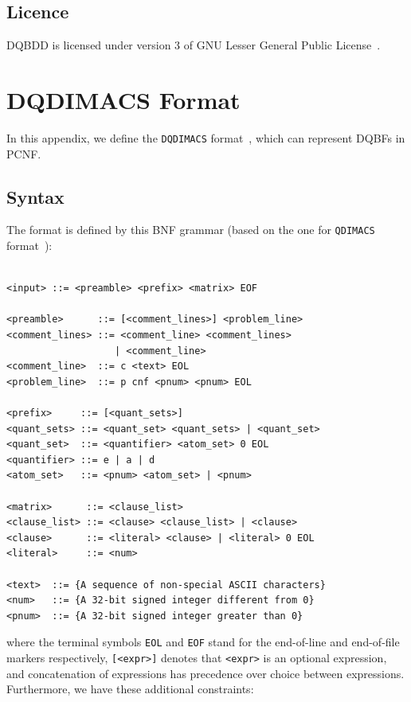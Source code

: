 \documentclass[
  digital, %
  color,
  twoside, %
  table,   %
  nolof,     %
  nolot,     %
]{fithesis3}
\theoremstyle{definition}
\theoremstyle{remark}
\newcommand{\DQDIMACS}[0]{\texttt{DQDIMACS}}
\begin{document}
\section{Licence}
DQBDD is licensed under version 3 of GNU Lesser General Public License~\cite{lgplv3}.

\chapter{DQDIMACS Format}
\label{appendix:DQDIMACS}
In this appendix, we define the \DQDIMACS{} format~\cite{iDQandDQDIMACS}, which can represent DQBFs in PCNF. 

\section{Syntax}
The format is defined by this BNF grammar (based on the one for \texttt{QDIMACS} format~\cite{QDIMACS}):
\begin{verbatim}

<input> ::= <preamble> <prefix> <matrix> EOF

<preamble>      ::= [<comment_lines>] <problem_line>
<comment_lines> ::= <comment_line> <comment_lines> 
                   | <comment_line> 
<comment_line>  ::= c <text> EOL
<problem_line>  ::= p cnf <pnum> <pnum> EOL

<prefix>     ::= [<quant_sets>]
<quant_sets> ::= <quant_set> <quant_sets> | <quant_set>
<quant_set>  ::= <quantifier> <atom_set> 0 EOL
<quantifier> ::= e | a | d
<atom_set>   ::= <pnum> <atom_set> | <pnum>

<matrix>      ::= <clause_list>
<clause_list> ::= <clause> <clause_list> | <clause> 
<clause>      ::= <literal> <clause> | <literal> 0 EOL
<literal>     ::= <num>

<text>  ::= {A sequence of non-special ASCII characters}
<num>   ::= {A 32-bit signed integer different from 0}
<pnum>  ::= {A 32-bit signed integer greater than 0}

\end{verbatim}
where the terminal symbols \verb|EOL| and \verb|EOF| stand for the end-of-line and end-of-file markers respectively, \verb|[<expr>]| denotes that \verb|<expr>| is an optional expression, and concatenation of expressions has precedence over choice between expressions. Furthermore, we have these additional constraints:
\end{document}
